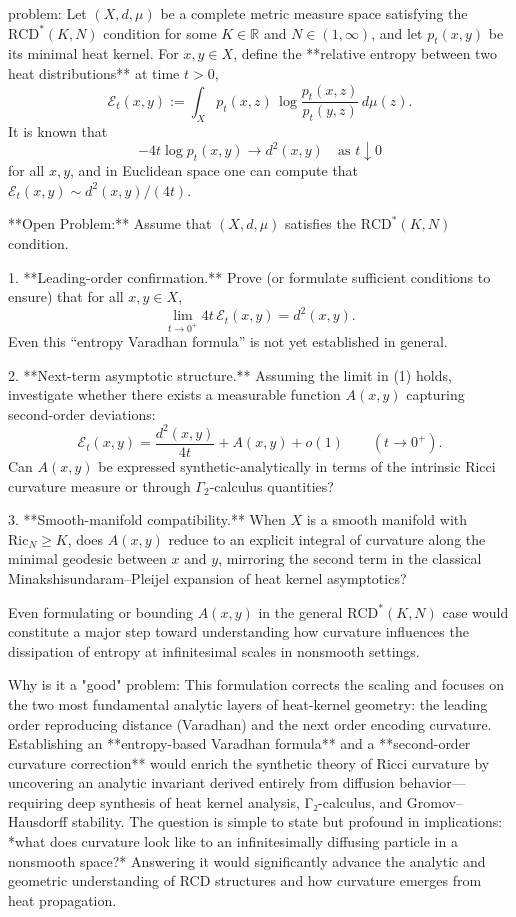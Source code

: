 problem:  
Let \((X,d,\mu)\) be a complete metric measure space satisfying the \(\mathrm{RCD}^*(K,N)\) condition for some \(K\in\mathbb{R}\) and \(N\in(1,\infty)\), and let \(p_t(x,y)\) be its minimal heat kernel.  
For \(x,y\in X\), define the **relative entropy between two heat distributions** at time \(t>0\),
\[
\mathcal{E}_t(x,y):=\int_X p_t(x,z)\,\log\frac{p_t(x,z)}{p_t(y,z)}\, d\mu(z).
\]
It is known that
\[
-\!4t\log p_t(x,y)\to d^2(x,y) \quad\text{as }t\downarrow 0
\]
for all \(x,y\), and in Euclidean space one can compute that \(\mathcal{E}_t(x,y)\sim d^2(x,y)/(4t)\).

**Open Problem:**  
Assume that \((X,d,\mu)\) satisfies the \(\mathrm{RCD}^*(K,N)\) condition.  

1. **Leading-order confirmation.**  
   Prove (or formulate sufficient conditions to ensure) that for all \(x,y\in X\),
   \[
   \lim_{t\to0^+}4t\,\mathcal{E}_t(x,y)=d^2(x,y).
   \]
   Even this “entropy Varadhan formula” is not yet established in general.

2. **Next-term asymptotic structure.**  
   Assuming the limit in (1) holds, investigate whether there exists a measurable function \(A(x,y)\) capturing second-order deviations:
   \[
   \mathcal{E}_t(x,y)=\frac{d^2(x,y)}{4t}+A(x,y)+o(1)\qquad (t\to0^+).
   \]
   Can \(A(x,y)\) be expressed synthetic-analytically in terms of the intrinsic Ricci curvature measure or through \(\Gamma_2\)-calculus quantities?  

3. **Smooth-manifold compatibility.**  
   When \(X\) is a smooth manifold with \(\mathrm{Ric}_N\ge K\), does \(A(x,y)\) reduce to an explicit integral of curvature along the minimal geodesic between \(x\) and \(y\), mirroring the second term in the classical Minakshisundaram–Pleijel expansion of heat kernel asymptotics?

Even formulating or bounding \(A(x,y)\) in the general \(\mathrm{RCD}^*(K,N)\) case would constitute a major step toward understanding how curvature influences the dissipation of entropy at infinitesimal scales in nonsmooth settings.

Why is it a "good" problem:  
This formulation corrects the scaling and focuses on the two most fundamental analytic layers of heat-kernel geometry: the leading order reproducing distance (Varadhan) and the next order encoding curvature.  Establishing an **entropy-based Varadhan formula** and a **second-order curvature correction** would enrich the synthetic theory of Ricci curvature by uncovering an analytic invariant derived entirely from diffusion behavior—requiring deep synthesis of heat kernel analysis, Γ₂-calculus, and Gromov–Hausdorff stability.  
The question is simple to state but profound in implications: *what does curvature look like to an infinitesimally diffusing particle in a nonsmooth space?*  Answering it would significantly advance the analytic and geometric understanding of RCD structures and how curvature emerges from heat propagation.